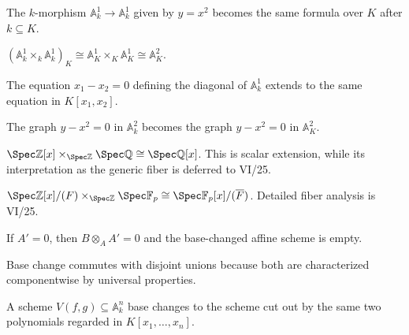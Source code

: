 \begin{example}\label{ex:vi24-r10}
The $k$-morphism $\mathbb A^1_k\to\mathbb A^1_k$ given by $y=x^2$ becomes the same formula over $K$ after $k\subseteq K$.
\end{example}

\begin{example}\label{ex:vi24-r11}
$(\mathbb A^1_k\times_k\mathbb A^1_k)_K\cong\mathbb A^1_K\times_K\mathbb A^1_K\cong\mathbb A^2_K$.
\end{example}

\begin{example}\label{ex:vi24-r12}
The equation $x_1-x_2=0$ defining the diagonal of $\mathbb A^1_k$ extends to the same equation in $K[x_1,x_2]$.
\end{example}

\begin{example}\label{ex:vi24-r13}
The graph $y-x^2=0$ in $\mathbb A^2_k$ becomes the graph $y-x^2=0$ in $\mathbb A^2_K$.
\end{example}

\begin{example}\label{ex:vi24-r14}
$\Spec\mathbb Z[x]\times_{\Spec\mathbb Z}\Spec\mathbb Q\cong\Spec\mathbb Q[x]$. This is scalar extension, while its interpretation as the generic fiber is deferred to VI/25.
\end{example}

\begin{example}\label{ex:vi24-r15}
$\Spec\mathbb Z[x]/(F)\times_{\Spec\mathbb Z}\Spec\mathbb F_p\cong\Spec\mathbb F_p[x]/(\overline F)$. Detailed fiber analysis is VI/25.
\end{example}

\begin{example}\label{ex:vi24-r16}
If $A' = 0$, then $B\otimes_AA'=0$ and the base-changed affine scheme is empty.
\end{example}

\begin{example}\label{ex:vi24-r17}
Base change commutes with disjoint unions because both are characterized componentwise by universal properties.
\end{example}

\begin{example}\label{ex:vi24-r18}
A scheme $V(f,g)\subseteq\mathbb A^n_k$ base changes to the scheme cut out by the same two polynomials regarded in $K[x_1,\ldots,x_n]$.
\end{example}

